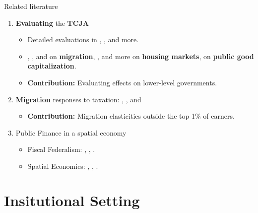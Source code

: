 \documentclass[10pt, aspectratio=169]{beamer}
\begin{document}
\begin{frame}{Related literature}
    \begin{enumerate}
        \item \textbf{Evaluating} the \textbf{TCJA}
        \begin{itemize}
            \item Detailed evaluations in \cite{Chodorow-ReichSmithZidarZwick2025}, \cite{KennedyDobridgeLandefeldMortenson2025}, \cite{Chodorow-ReichZidarZwick2024} and  more.
            \item \cite{drukker}, \cite{YoungLurie2025}, \cite{Coen-PiraniSieg2019} and \cite{BruceKessler2022} on \textbf{migration}, \cite{Horton2023},  \cite{LiYu2022} and more on \textbf{housing markets}, \cite{AmbroseValentin2025} on \textbf{public good capitalization}.
            \item \alert{\textbf{Contribution:}} Evaluating effects on lower-level governments.
        \end{itemize}
        \vspace{.25cm}
        \item \textbf{Migration} responses to taxation: \cite{AkcigitBaslandzeStantcheva2016}, \cite{KlevenLandaisMunozStantcheva}, \cite{YoungVarnerLuriePrisinzano2016} and \cite{LiebigPuhaniSousa-Poza2007}
        \begin{itemize}
            \item \alert{\textbf{Contribution:}} Migration elasticities outside the top 1\% of earners.
        \end{itemize}
        \vspace{.25cm}
        \item {Public Finance} in a {spatial economy}
        \begin{itemize}
            \item Fiscal Federalism: \cite{Tiebout1956}, \cite{Oates1972}, \cite{Wilson1986}.
            \item Spatial Economics: \cite{Albouy2012}, \cite{FajgelbaumGaubert}, \cite{GaubertKlineVergaraYagan2025}.
        \end{itemize}
    \end{enumerate}
\end{frame}

\section{Insitutional Setting}
\end{document}
